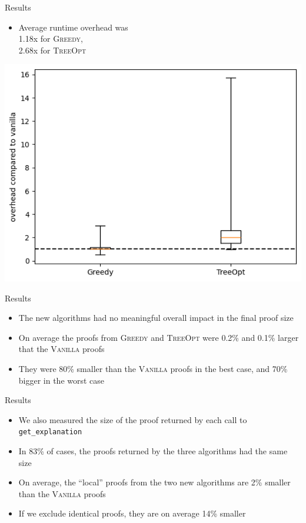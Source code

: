 \documentclass[aspectratio=169]{beamer}
\newcommand\vitem{\vfill\item}
\newcommand\pvitem{\pause\vfill\item}
\begin{document}
\begin{frame}{Results}
  \begin{minipage}[c][0.5 \textheight]{0.3 \textwidth}
  \begin{itemize}
    \item Average runtime overhead was\\1.18x for \textsc{Greedy},\\2.68x
    for \textsc{TreeOpt}
  \end{itemize}
  \end{minipage}
  \hfill
  \begin{minipage}{0.68 \textwidth}
  \centerline{\includegraphics[width=\textwidth]{images/runtime-boxplot.png}}
  \end{minipage}
\end{frame}

\begin{frame}{Results}
  \begin{itemize}
    \item The new algorithms had no meaningful overall impact in the final proof
    size
    \vitem On average the proofs from \textsc{Greedy} and \textsc{TreeOpt} were
    0.2\% and 0.1\% larger that the \textsc{Vanilla} proofs
    \vitem They were 80\% smaller than the \textsc{Vanilla} proofs in the best
    case, and 70\% bigger in the worst case
  \end{itemize}
\end{frame}

\begin{frame}{Results}
  \begin{itemize}
    \item We also measured the size of the proof returned by each call to
    \texttt{get\_explanation}
    \vitem In 83\% of cases, the proofs returned by the three algorithms had the
    same size
    \vitem On average, the ``local'' proofs from the two new algorithms are 2\%
    smaller than the \textsc{Vanilla} proofs
    \pvitem If we exclude identical proofs, they are on average 14\% smaller
  \end{itemize}
\end{frame}
\end{document}
